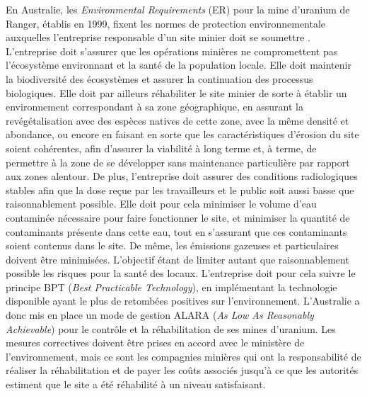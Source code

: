 \documentclass{article}
\begin{document}
En Australie, les \textit{Environmental Requirements} (ER) pour la mine d’uranium de Ranger, établis en 1999, fixent les normes de protection environnementale auxquelles l’entreprise responsable d’un site minier doit se soumettre \cite{noauthor_department_nodate}.
L’entreprise doit s’assurer que les opérations minières ne compromettent pas l’écosystème environnant et la santé de la population locale. Elle doit maintenir la biodiversité des écosystèmes et assurer la continuation des processus biologiques. Elle doit par ailleurs réhabiliter le site minier de sorte à établir un environnement correspondant à sa zone géographique, en assurant la revégétalisation avec des espèces natives de cette zone, avec la même densité et abondance, ou encore en faisant en sorte que les caractéristiques d’érosion du site soient cohérentes, afin d’assurer la viabilité à long terme et, à terme, de permettre à la zone de se développer sans maintenance particulière par rapport aux zones alentour. De plus, l’entreprise doit assurer des conditions radiologiques stables afin que la dose reçue par les travailleurs et le public soit aussi basse que raisonnablement possible. Elle doit pour cela minimiser le volume d’eau contaminée nécessaire pour faire fonctionner le site, et minimiser la quantité de contaminants présente dans cette eau, tout en s’assurant que ces contaminants soient contenus dans le site. De même, les émissions gazeuses et particulaires doivent être minimisées. L’objectif étant de limiter autant que raisonnablement possible les risques pour la santé des locaux.
L’entreprise doit pour cela suivre le principe BPT (\textit{Best Practicable Technology}), en implémentant la technologie disponible ayant le plus de retombées positives sur l’environnement. L’Australie a donc mis en place un mode de gestion ALARA (\textit{As Low As Reasonably Achievable}) pour le contrôle et la réhabilitation de ses mines d’uranium.
Les mesures correctives doivent être prises en accord avec le ministère de l’environnement, mais ce sont les compagnies minières qui ont la responsabilité de réaliser la réhabilitation et de payer les coûts associés jusqu’à ce que les autorités estiment que le site a été réhabilité à un niveau satisfaisant.
\end{document}
